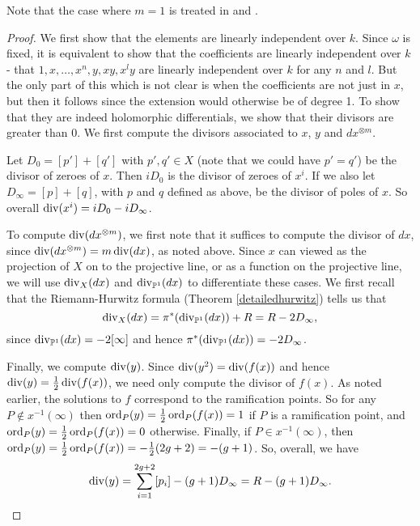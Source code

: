     \begin{rem}
    Note that the case where $m=1$ is treated in \cite[Prop. 7.4.26]{liu} and \cite[Ch. IV, \S 4, Prop. 4.3]{griffiths}.
    \end{rem}
    
    \begin{proof}
    We first show that the elements are linearly independent over $k$.
    Since $\omega$ is fixed, it is equivalent to show that the coefficients are linearly independent over $k$ - \ie that $1,x,\ldots ,x^n, y, xy, x^ly$ are linearly independent over $k$ for any $n$ and $l$.
    But the only part of this which is not clear is when the coefficients are not just in $x$, but then it follows since the extension would otherwise be of degree 1.
    To show that they are indeed holomorphic differentials, we show that their divisors are greater than $0$.
    We first compute the divisors associated to $x$, $y$ and $dx^{\otimes m}$.
    
    Let $D_0 = [p']+[q']$ with $p',q' \in X$ (note that we could have $p' = q'$) be the divisor of zeroes of $x$. 
    Then $ i D_0$ is the divisor of zeroes of $x^i$. 
    If we also let $D_\infty = [p] + [q]$, with $p$ and $q$ defined as above, be the divisor of poles of $x$. 
    So overall $\operatorname{div} (x^i) = i D_0 - i D_\infty$.
    
    
    To compute $\operatorname{div} (dx^{\otimes m})$, we first note that it suffices to compute the divisor of $dx$, since $\operatorname{div} (dx^{\otimes m}) =m\operatorname{div} (dx)$, as noted above.
    Since $x$ can viewed as the projection of $X$ on to the projective line, or as a function on the projective line, we will use $\operatorname{div}_X (dx)$ and $\operatorname{div}_{\mathbb P^1} (dx)$ to differentiate these cases.
    We first recall that the Riemann-Hurwitz formula (Theorem \ref{detailedhurwitz}) tells us that
        \[
        \operatorname{div}_X (dx) = \pi^*( \operatorname{div}_{\mathbb P^1}(dx)) + R = R - 2D_{\infty},
        \]
    since $\operatorname{div}_{\mathbb P^1}(dx) = -2[\infty]$ and hence $\pi^* (\operatorname{div}_{\mathbb P^1}(dx)) = -2D_\infty$.
    
    Finally, we compute $\operatorname{div} (y)$.
    Since $\operatorname{div} (y^2) = \operatorname{div} (f(x))$ and hence $\operatorname{div}(y) = \frac{1}{2}\operatorname{div}(f(x))$, we need only compute the divisor of $f(x)$.
    As noted earlier, the solutions to $f$ correspond to the ramification points.
    So for any $P\notin x^{-1}(\infty)$ then $\operatorname{ord}_P(y) =  \frac{1}{2}\operatorname{ord}_P(f(x)) = 1$ if $P$ is a ramification point, and $\operatorname{ord}_P(y) = \frac{1}{2}\operatorname{ord}_P(f(x)) = 0$ otherwise.
    Finally, if $P\in x^{-1}(\infty)$, then $\operatorname{ord}_P(y)  = \frac{1}{2}\operatorname{ord}_P(f(x)) = - \frac{1}{2} (2g+2) = -(g+1)$.
    So, overall, we have 
        \[
        \operatorname{div}(y) = \sum_{i=1}^{2g+2} [p_i]- (g+1)D_\infty = R - (g+1)D_{\infty}.
        \]
    

\end{proof}
